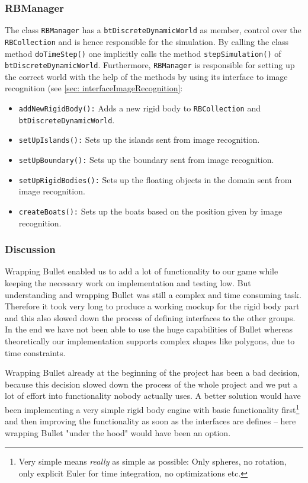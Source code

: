 \subsubsection*{RBManager}
\label{sec: rbManager}
The class \texttt{RBManager} has a \texttt{btDiscreteDynamicWorld} as member, control over the \texttt{RBCollection} and is hence responsible for the simulation. By calling the class method \texttt{doTimeStep()} one implicitly calls the method \texttt{stepSimulation()} of \texttt{btDiscreteDynamicWorld}. 
 Furthermore, \texttt{RBManager} is responsible for setting up the correct world with the help of the methods by using its  interface to image recognition (see \autoref{sec: interfaceImageRecognition}:
\begin{itemize}
\item \texttt{addNewRigidBody():} Adds a new rigid body to \texttt{RBCollection} and \texttt{btDiscreteDynamicWorld}.
\item \texttt{setUpIslands():} Sets up the islands sent from image recognition.
\item \texttt{setUpBoundary():} Sets up the boundary sent from image recognition.
\item \texttt{setUpRigidBodies():} Sets up the floating objects in the domain sent from image recognition.
\item \texttt{createBoats():} Sets up the boats based on the position given by image recognition.
\end{itemize}

\subsubsection{Discussion}
Wrapping Bullet enabled us to add a lot of functionality to our game while keeping the necessary work on implementation and testing low. But understanding and wrapping Bullet was still a complex and time consuming task. Therefore it took very long to produce a working mockup for the rigid body part and this also slowed down the process of defining interfaces to the other groups. In the end we have not been able to use the huge capabilities of Bullet whereas theoretically our implementation supports complex shapes like polygons, due to time constraints.

Wrapping Bullet already at the beginning of the project has been a bad decision, because this decision slowed down the process of the whole project and we put a lot of effort into functionality nobody actually uses. A better solution would have been implementing a very simple rigid body engine with basic functionality first\footnote{Very simple means \emph{really} as simple as possible: Only spheres, no rotation, only explicit Euler for time integration, no optimizations etc.} and then improving the functionality as soon as the interfaces are defines -- here wrapping Bullet "under the hood" would have been an option.

